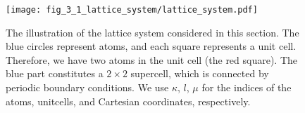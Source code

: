 \begin{figure}[htb]
 \centering
  \texttt{[image: fig\_3\_1\_lattice\_system/lattice\_system.pdf]}
  \caption{The illustration of the lattice system considered in this section. The blue circles represent atoms, and each square represents a unit cell. Therefore, we have two atoms in the unit cell (the red square). The blue part constitutes a $2\times 2$ supercell, which is connected by periodic boundary conditions. We use $\kappa$, $l$, $\mu$ for the indices of the atoms, unitcells, and Cartesian coordinates, respectively.}
\label{Fig:lattice_system}
\end{figure}